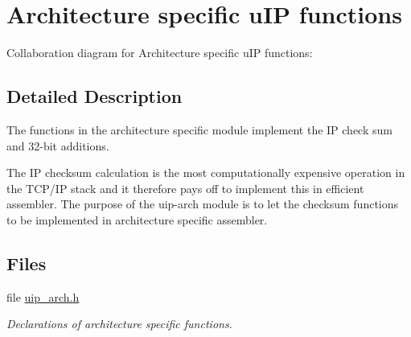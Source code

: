 \hypertarget{a00066}{
\section{Architecture specific u\-IP functions}
\label{a00066}
}


Collaboration diagram for Architecture specific u\-IP functions:

\subsection{Detailed Description}
The functions in the architecture specific module implement the IP check sum and 32-bit additions. 

The IP checksum calculation is the most computationally expensive operation in the TCP/IP stack and it therefore pays off to implement this in efficient assembler. The purpose of the uip-arch module is to let the checksum functions to be implemented in architecture specific assembler. 

\subsection*{Files}
\begin{CompactItemize}
\item 
file \hyperlink{a00055}{uip\_\-arch.h}
\begin{CompactList}\small\item\em Declarations of architecture specific functions. \item\end{CompactList}

\end{CompactItemize}
